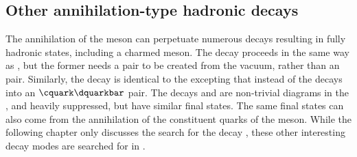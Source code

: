 



\subsection{Other annihilation-type hadronic decays}
The annihilation of the \Bp meson can perpetuate numerous decays resulting in fully hadronic
states, including a charmed meson.
The decay \decay{\Bp}{\Dp\Kstarz} proceeds in the same way as
\btodsphi, but the former needs a \ddbar pair to be created from the \QCD vacuum, rather than an
\ssbar pair.
Similarly, the decay \decay{\Bp}{\Ds\Kstarzb} is identical to the \btodsphi excepting that instead
of \decay{\Wp}{\cquark\squarkbar} the \Wp decays into an $\cquark\dquarkbar$ pair.
The decays \decay{\Bp}{\Dp\Kstarzb} and \decay{\Bp}{\Ds\Kstarz} are non-trivial diagrams in the
\sm, and heavily suppressed, but have similar final states.
The same final states can also come from the annihilation of the constituent
quarks of the \Bc meson.
While the following chapter only discusses the search for the decay \btodsphi, these other
interesting decay modes are searched for in
.






